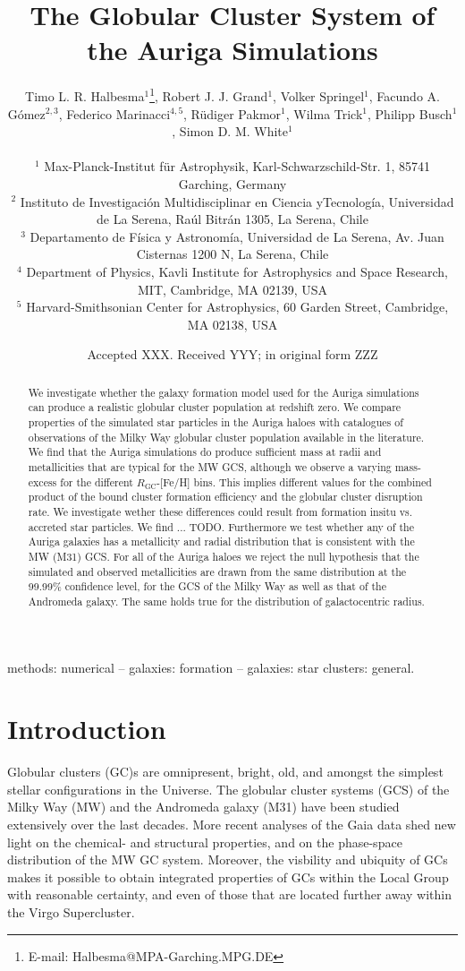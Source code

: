 \documentclass[a4paper,fleqn,usenatbib]{mnras}
\title[Auriga GCS]{The Globular Cluster System of the Auriga Simulations}
\author[T. L. R. Halbesma et al.]{\parbox[t]{\textwidth}{
    Timo L. R. Halbesma$^{1}$\thanks{E-mail: Halbesma@MPA-Garching.MPG.DE},
    Robert J. J. Grand$^{1}$,
    Volker Springel$^{1}$,
    Facundo A. G\'{o}mez$^{2,3}$,
    Federico Marinacci$^{4,5}$,
    R\"{u}diger Pakmor$^{1}$,
    Wilma Trick$^{1}$,
    Philipp Busch$^{1}$,
    Simon D. M. White$^{1}$
} \vspace{10pt} \\
$^{1}$ Max-Planck-Institut f\"ur Astrophysik, Karl-Schwarzschild-Str. 1,
    85741 Garching, Germany \\
$^{2}$ Instituto de Investigaci\'{o}n Multidisciplinar en Ciencia yTecnolog\'{i}a,
    Universidad de La Serena, Ra\'{u}l Bitr\'{a}n 1305, La Serena, Chile \\
$^{3}$ Departamento de F\'{i}sica y Astronom\'{i}a, Universidad de La Serena, Av.
    Juan Cisternas 1200 N, La Serena, Chile \\
$^{4}$ Department of Physics, Kavli Institute for Astrophysics and Space Research,
    MIT, Cambridge, MA 02139, USA \\
$^{5}$ Harvard-Smithsonian Center for Astrophysics, 60 Garden Street, Cambridge,
    MA 02138, USA \\
}
\date{Accepted XXX. Received YYY; in original form ZZZ}
\begin{document}
\label{firstpage}
\pagerange{\pageref{firstpage}--\pageref{lastpage}}
\maketitle

\begin{abstract}
We investigate whether the galaxy formation model used for the Auriga simulations
can produce a realistic globular cluster population at redshift zero. We compare
properties of the simulated star particles in the Auriga haloes with
catalogues of observations of the Milky Way globular cluster population available
in the literature. We find that the Auriga simulations do produce sufficient mass
at radii and metallicities that are typical for the MW GCS, although we observe
a varying mass-excess for the different $R_{\text{GC}}$-[Fe/H] bins. This implies
different values for the combined product of the bound cluster formation efficiency
and the globular cluster disruption rate. We investigate wether these differences
could result from formation insitu vs. accreted star particles. We find ... TODO.
Furthermore we test whether any of the Auriga galaxies has a metallicity and radial
distribution that is consistent with the MW (M31) GCS. For all of the Auriga haloes
we reject the null hypothesis that the simulated and observed metallicities are
drawn from the same distribution at the 99.99\% confidence level, for the GCS
of the Milky Way as well as that of the Andromeda galaxy. The same holds true for
the distribution of galactocentric radius.
\end{abstract}

\begin{keywords}
methods: numerical -- galaxies: formation -- galaxies: star clusters: general.
\end{keywords}



\section{Introduction}
Globular clusters (GC)s are omnipresent, bright, old, and amongst the simplest
stellar configurations in the Universe. The globular cluster systems (GCS) of
the Milky Way (MW) and the Andromeda galaxy (M31) have been studied extensively 
over the last decades. More recent analyses of the Gaia data shed new light on the 
chemical- and structural properties, and on the phase-space distribution 
of the MW GC system.
Moreover, the visbility and ubiquity of GCs makes it possible to obtain integrated 
properties of GCs within the Local Group with reasonable certainty, and even of 
those that are located further away within the Virgo Supercluster.
\end{document}

